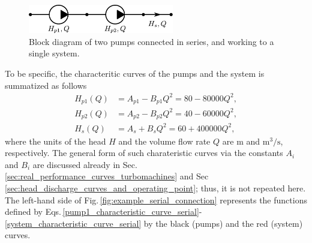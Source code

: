 \begin{figure}[ht!]
	\centering
		\includegraphics[height=1.25cm]{Control/Figures/Block_Diagram_Serial_Connection.pdf}
	\caption{Block diagram of two pumps connected in series, and working to a single system.}
	\label{fig:block_diagram_serial_connection}
\end{figure}

To be specific, the characteritic curves of the pumps and the system is summatized as follows
%
\begin{align}
H_{p1}(Q) &= A_{p1} - B_{p1} Q^2 = 80 -  80000 Q^2, \label{pump1_characteristic_curve_serial} \\
H_{p2}(Q) &= A_{p2} - B_{p2} Q^2 = 40 -  60000 Q^2, \label{pump2_characteristic_curve_serial} \\
H_s(Q)    &= A_s    + B_s    Q^2 = 60 + 400000 Q^2, \label{system_characteristic_curve_serial}
\end{align}
%
where the units of the head $H$ and the volume flow rate $Q$ are $\mathrm{m}$ and $\mathrm{m^3/s}$, respectively. The general form of such charateristic curves via the constants $A_i$ and $B_i$ are discussed already in Sec.\,\ref{sec:real_performance_curves_turbomachines} and Sec\,\ref{sec:head_discharge_curves_and_operating_point}; thus, it is not repeated here. The left-hand side of Fig.\,\ref{fig:example_serial_connection} represents the functions defined by Eqs.\,\eqref{pump1_characteristic_curve_serial}-\eqref{system_characteristic_curve_serial} by the black (pumps) and the red (system) curves.

